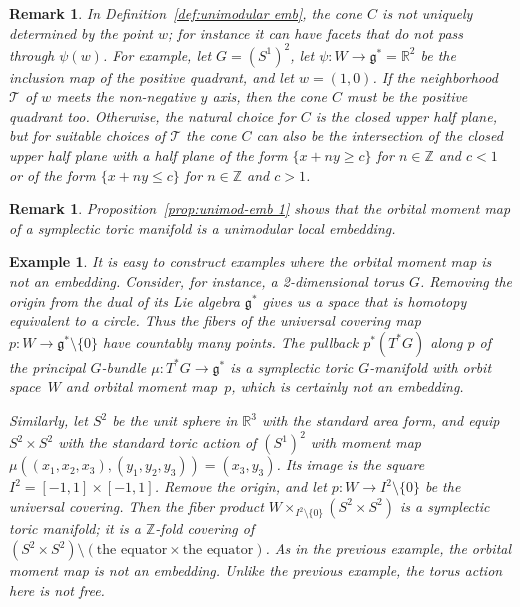 \documentclass[pdftex]{sigma}
\numberwithin{equation}{section}
\newtheorem{Example}[Lemma]{Example}
\newtheorem{Remark}[Lemma]{Remark}
\begin{document}
\begin{Remark}
In Def\/inition~\ref{def:unimodular emb},
the cone $C$ is not uniquely determined by the point $w$;
for instance it can have facets that do not pass through $\psi(w)$.
For example, let $G = (S^1)^2$, let $\psi \colon W \to {\mathfrak g}^* = {\mathbb R}^2$
be the inclusion map of the positive quadrant, and let $w = (1,0)$.
If the neighborhood ${\mathcal T}$ of $w$ meets the non-negative $y$ axis,
then the cone $C$ must be the positive quadrant too.  Otherwise,
the natural choice for $C$ is the closed upper half plane,
but for suitable choices of ${\mathcal T}$ the cone $C$ can also be
the intersection of the closed upper half plane
with a half plane of the form $\{ x+ny \geq c \}$ for $n \in {\mathbb Z}$ and $c<1$
or of the form $\{ x+ny \leq c \}$ for $n \in {\mathbb Z}$ and $c>1$.
\end{Remark}

\begin{Remark}
  Proposition~\ref{prop:unimod-emb 1} shows that the orbital moment
  map of a symplectic toric manifold is a unimodular local embedding.
\end{Remark}

\begin{Example} \label{ex:mmap-not-emb}
  It is easy to construct examples where the orbital moment map is not
  an embedding.  Consider, for instance, a 2-dimensional torus $G$.
  Removing the origin from the dual of its Lie algebra ${\mathfrak g}^*$ gives
  us a space
   that is
  homotopy equivalent to a circle.  Thus the f\/ibers of the
  universal covering map $p \colon W\to {\mathfrak g}^*\setminus \{0\}$ have
  countably many points.  The pullback $p^*(T^*G)$ along $p$ of the
  principal $G$-bundle $\mu \colon T^*G \to {\mathfrak g}^*$ is a symplectic toric
  $G$-manifold with orbit space~$W$ and orbital moment map~$p$, which is
  certainly not an embedding.

Similarly, let $S^2$ be the unit sphere in ${\mathbb R}^3$ with the standard
area form, and equip~$S^2 \times S^2$ with the standard toric action
of $(S^1)^2$ with moment map $\mu((x_1,x_2,x_3),(y_1,y_2,y_3)) = (x_3,y_3)$.
Its image is the square $I^2 = [-1,1] \times [-1,1]$.
Remove the origin, and let
$p \colon W \to I^2 \setminus \{ 0 \}$ be the universal covering.
Then the f\/iber product $W \times_{I^2 \setminus \{ 0 \} } (S^2 \times S^2)$
is a symplectic toric manifold; it is a ${\mathbb Z}$-fold covering
of $(S^2 \times S^2) \setminus ( \text{the equator} \times \text{the equator})$.
As in the previous example, the orbital moment map is not an embedding.
Unlike the previous example, the torus action  here is not free.
\end{Example}
\end{document}
